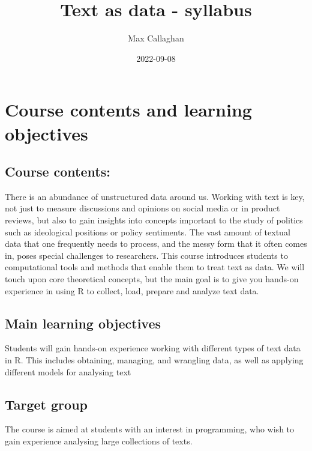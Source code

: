 \documentclass[
]{article}
\title{Text as data - syllabus}
\author{Max Callaghan}
\date{2022-09-08}
\begin{document}
\maketitle

\hypertarget{course-contents-and-learning-objectives}{%
\section{Course contents and learning
objectives}\label{course-contents-and-learning-objectives}}

\hypertarget{course-contents}{%
\subsection{Course contents:}\label{course-contents}}

There is an abundance of unstructured data around us. Working with text
is key, not just to measure discussions and opinions on social media or
in product reviews, but also to gain insights into concepts important to
the study of politics such as ideological positions or policy
sentiments. The vast amount of textual data that one frequently needs to
process, and the messy form that it often comes in, poses special
challenges to researchers. This course introduces students to
computational tools and methods that enable them to treat text as data.
We will touch upon core theoretical concepts, but the main goal is to
give you hands-on experience in using R to collect, load, prepare and
analyze text data.

\hypertarget{main-learning-objectives}{%
\subsection{Main learning objectives}\label{main-learning-objectives}}

Students will gain hands-on experience working with different types of
text data in R. This includes obtaining, managing, and wrangling data,
as well as applying different models for analysing text

\hypertarget{target-group}{%
\subsection{Target group}\label{target-group}}

The course is aimed at students with an interest in programming, who
wish to gain experience analysing large collections of texts.
\end{document}
